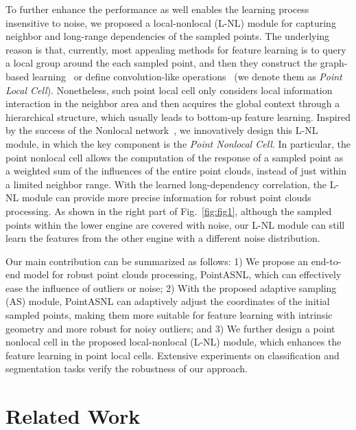 \documentclass[10pt,twocolumn,letterpaper]{article}
\begin{document}
	To further enhance the performance as well enables the learning process insensitive to noise, we proposed a local-nonlocal (L-NL) module for capturing neighbor and long-range dependencies of the sampled points. The underlying reason is that, currently, most appealing methods for feature learning is to query a local group around the each sampled point, and then they construct the graph-based learning~\cite{ecc,DGCNN,PointWeb, HPEIN} or define convolution-like operations~\cite{Pointwise,Spidercnn,groh2018flex,PCNN,PointConv,KPCONV} (we denote them as \textit{Point Local Cell}). Nonetheless, such point local cell only considers local information interaction in the neighbor area and then acquires the global context through a hierarchical structure, which usually leads to bottom-up feature learning. Inspired by the success of the Nonlocal network~\cite{Nonlocal}, we innovatively design this L-NL module, in which the key component is the \textit{Point Nonlocal Cell}. In particular, the point nonlocal cell allows the computation of the response of a sampled point as a weighted sum of the influences of the entire point clouds, instead of just within a limited neighbor range. With the learned long-dependency correlation, the L-NL module can provide more precise information for robust point clouds processing. As shown in the right part of Fig.~\ref{fig:fig1}, although the sampled points within the lower engine are covered with noise, our L-NL module can still learn the features from the other engine with a different noise distribution.
	




	Our main contribution can be summarized as follows: 1) We propose an end-to-end model for robust point clouds processing, PointASNL, which can effectively ease the influence of outliers or noise; 2) With the proposed adaptive sampling (AS) module, PointASNL can adaptively adjust the coordinates of the initial sampled points, making them more suitable for feature learning with intrinsic geometry and more robust for noisy outliers; and 3) We further design a point nonlocal cell in the proposed local-nonlocal (L-NL) module, which enhances the feature learning in point local cells. Extensive experiments on classification and segmentation tasks verify the robustness of our approach.
	
	


	
	


	\section{Related Work}
	
\end{document}
